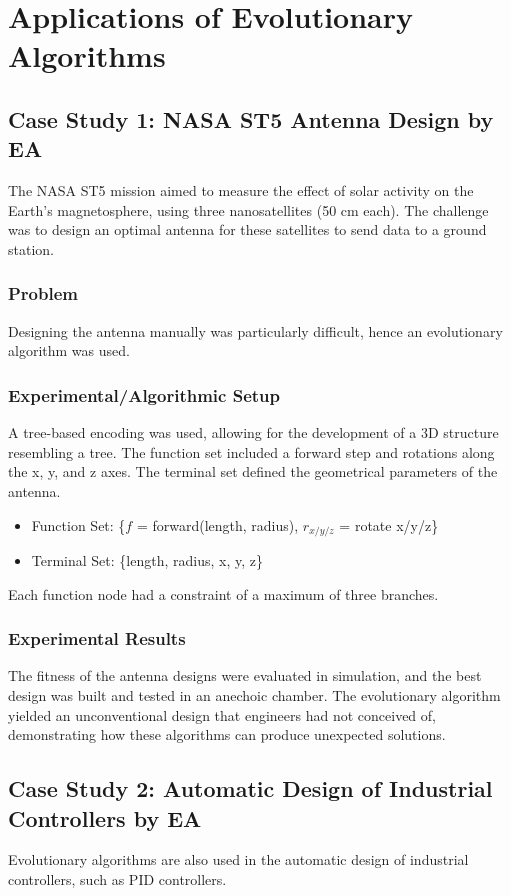 \section{Applications of Evolutionary Algorithms}

\subsection*{Case Study 1: NASA ST5 Antenna Design by EA}
The NASA ST5 mission aimed to measure the effect of solar activity on the Earth's magnetosphere, using three nanosatellites (50 cm each). The challenge was to design an optimal antenna for these satellites to send data to a ground station.
\subsubsection*{Problem}
Designing the antenna manually was particularly difficult, hence an evolutionary algorithm was used.
\subsubsection*{Experimental/Algorithmic Setup}
A tree-based encoding was used, allowing for the development of a 3D structure resembling a tree. The function set included a forward step and rotations along the x, y, and z axes. The terminal set defined the geometrical parameters of the antenna.
\begin{itemize}
    \item Function Set: \{$f$ = forward(length, radius), $r_{x/y/z}$ = rotate x/y/z\}
    \item Terminal Set: \{length, radius, x, y, z\}
\end{itemize}
Each function node had a constraint of a maximum of three branches.
\subsubsection*{Experimental Results}
The fitness of the antenna designs were evaluated in simulation, and the best design was built and tested in an anechoic chamber. The evolutionary algorithm yielded an unconventional design that engineers had not conceived of, demonstrating how these algorithms can produce unexpected solutions.

\subsection*{Case Study 2: Automatic Design of Industrial Controllers by EA}
Evolutionary algorithms are also used in the automatic design of industrial controllers, such as PID controllers.
